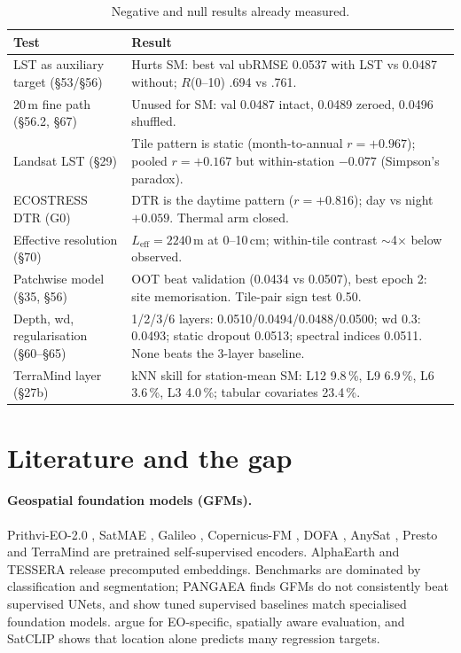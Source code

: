 \documentclass[11pt,a4paper]{article}
\begin{document}
\begin{table}[h]
\centering\small
\caption{Negative and null results already measured.}
\begin{tabularx}{\linewidth}{@{}l Y@{}}
\toprule
Test & Result \\
\midrule
LST as auxiliary target (\S53/\S56) & Hurts SM: best val ubRMSE 0.0537 with LST vs 0.0487 without; $R$(0--10) .694 vs .761. \\
20\,m fine path (\S56.2, \S67) & Unused for SM: val 0.0487 intact, 0.0489 zeroed, 0.0496 shuffled. \\
Landsat LST (\S29) & Tile pattern is static (month-to-annual $r=+0.967$); pooled $r=+0.167$ but within-station $-0.077$ (Simpson's paradox). \\
ECOSTRESS DTR (G0) & DTR is the daytime pattern ($r=+0.816$); day vs night $+0.059$. Thermal arm closed. \\
Effective resolution (\S70) & $L_\mathrm{eff}=2240$\,m at 0--10\,cm; within-tile contrast $\sim$4$\times$ below observed. \\
Patchwise model (\S35, \S56) & OOT beat validation (0.0434 vs 0.0507), best epoch 2: site memorisation. Tile-pair sign test 0.50. \\
Depth, wd, regularisation (\S60--\S65) & 1/2/3/6 layers: 0.0510/0.0494/0.0488/0.0500; wd 0.3: 0.0493; static dropout 0.0513; spectral indices 0.0511. None beats the 3-layer baseline. \\
TerraMind layer (\S27b) & kNN skill for station-mean SM: L12 9.8\,\%, L9 6.9\,\%, L6 3.6\,\%, L3 4.0\,\%; tabular covariates 23.4\,\%. \\
\bottomrule
\end{tabularx}
\end{table}

\section{Literature and the gap}

\paragraph{Geospatial foundation models (GFMs).} Prithvi-EO-2.0 \citep{szwarcman2024prithvi},
SatMAE \citep{cong2022satmae}, Galileo \citep{tseng2025galileo}, Copernicus-FM
\citep{wang2025copernicusfm}, DOFA \citep{xiong2024dofa}, AnySat \citep{astruc2024anysat},
Presto \citep{tseng2023presto} and TerraMind \citep{jakubik2025terramind} are pretrained
self-supervised encoders. AlphaEarth \citep{brown2025alphaearth} and TESSERA
\citep{feng2025tessera} release precomputed embeddings. Benchmarks
\citep{lacoste2023geobench,marsocci2024pangaea,wang2025copernicusfm} are dominated by
classification and segmentation; PANGAEA finds GFMs do not consistently beat supervised UNets,
and \citet{xu2025specialized} show tuned supervised baselines match specialised foundation models.
\citet{rolf2024position} argue for EO-specific, spatially aware evaluation, and SatCLIP
\citep{klemmer2025satclip} shows that location alone predicts many regression targets.
\end{document}

